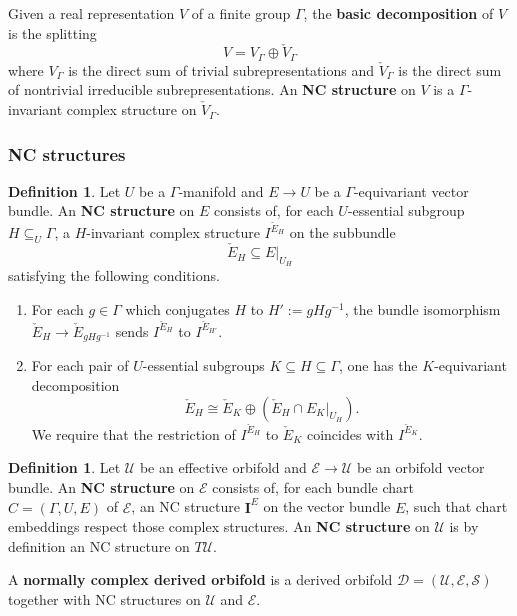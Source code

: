 \documentclass[reqno, 10pt]{amsart}
\numberwithin{equation}{section}
\numberwithin{equation}{section}
\renewcommand{\subset}{\subseteq}
\theoremstyle{definition}
\newtheorem{defn}[thm]{Definition}
\theoremstyle{remark}
\newcommand{\beqn}{\begin{equation*}}
\newcommand{\eeqn}{\end{equation*}}
\newcommand{\mc}{\mathcal}
\begin{document}
Given a real representation $V$ of a finite group $\Gamma$, the {\bf basic decomposition} of $V$ is the splitting
\beqn
V = V_\Gamma \oplus \check V_\Gamma
\eeqn
where $V_\Gamma$ is the direct sum of trivial subrepresentations and $\check V_\Gamma$ is the direct sum of nontrivial irreducible subrepresentations. An {\bf NC structure} on $V$ is a $\Gamma$-invariant complex structure on $\check V_\Gamma$. 

\subsubsection{NC structures}

\begin{defn}
Let $U$ be a $\Gamma$-manifold and $E \to U$ be a $\Gamma$-equivariant vector bundle. An {\bf NC structure} on $E$ consists of, for each $U$-essential subgroup $H \subset_U \Gamma$, a $H$-invariant complex structure $I^{\check E_H}$ on the subbundle
\beqn
\check E_H \subset E|_{U_H}
\eeqn
satisfying the following conditions.
\begin{enumerate}
    \item For each $g\in \Gamma$ which conjugates $H$ to $H':= g H g^{-1}$, the bundle isomorphism $\check E_H \to \check E_{g H g^{-1}}$ sends $I^{\check E_H}$ to $I^{\check E_{H'}}$.

    \item For each pair of $U$-essential subgroups $K \subset H \subset \Gamma$, one has the $K$-equivariant decomposition  
    \beqn
    \check E_H \cong \check E_K \oplus (\check E_H \cap E_K|_{U_H}).
    \eeqn
    We require that the restriction of $I^{\check E_H}$ to $\check E_K$ coincides with $I^{\check E_K}$.
\end{enumerate}

\end{defn}

\begin{defn}
Let ${\mc U}$ be an effective orbifold and ${\mc E} \to {\mc U}$ be an orbifold vector bundle. An {\bf NC structure} on ${\mc E}$ consists of, for each bundle chart $\hat C = (\Gamma, U, E)$ of ${\mc E}$, an NC structure ${\bm I}^E$ on the vector bundle $E$, such that chart embeddings respect those complex structures. An {\bf NC structure} on ${\mc U}$ is by definition an NC structure on $T{\mc U}$.

A {\bf normally complex derived orbifold} is a derived orbifold ${\mc D} = ({\mc U}, {\mc E}, {\mc S})$ together with NC structures on ${\mc U}$ and ${\mc E}$.
\end{defn}
\end{document}
